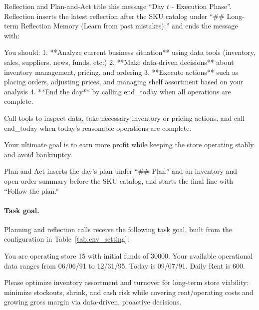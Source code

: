 Reflection and Plan-and-Act title this message ``Day $t$ - Execution Phase''. Reflection inserts the latest reflection after the SKU catalog under ``\#\# Long-term Reflection Memory (Learn from past mistakes):'' and ends the message with:
\begin{PromptBox}
You should:
1. **Analyze current business situation** using data tools (inventory, sales, suppliers, news, funds, etc.)
2. **Make data-driven decisions** about inventory management, pricing, and ordering
3. **Execute actions** such as placing orders, adjusting prices, and managing shelf assortment based on your analysis
4. **End the day** by calling end_today when all operations are complete.

Call tools to inspect data, take necessary inventory or pricing actions, and call end_today when today's reasonable operations are complete.

Your ultimate goal is to earn more profit while keeping the store operating stably and avoid bankruptcy.
\end{PromptBox}

Plan-and-Act inserts the day's plan under ``\#\# Plan'' and an inventory and open-order summary before the SKU catalog, and starts the final line with ``Follow the plan.''

\paragraph{Task goal.}
Planning and reflection calls receive the following task goal, built from the configuration in Table~\ref{tab:env_setting}:
\begin{PromptBox}
You are operating store 15 with initial funds of 30000. Your available operational data ranges from 06/06/91 to 12/31/95. Today is 09/07/91. Daily Rent is 600.

Please optimize inventory assortment and turnover for long-term store viability: minimize stockouts, shrink, and cash risk while covering rent/operating costs and growing gross margin via data-driven, proactive decisions.
\end{PromptBox}

